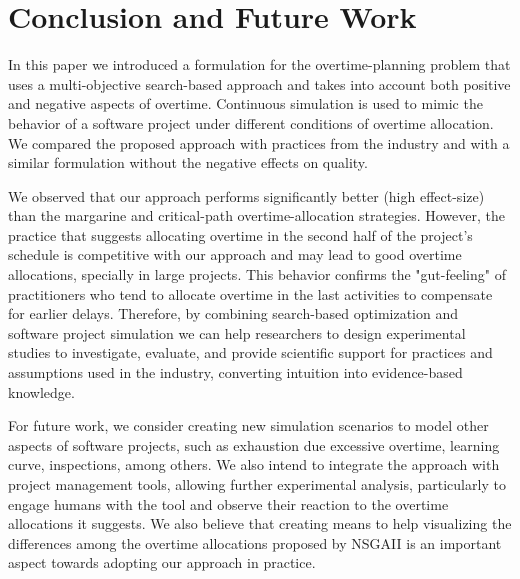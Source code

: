 \documentclass[conference]{IEEEtran}
\begin{document}
\section{Conclusion and Future Work}

In this paper we introduced a formulation for the overtime-planning problem that uses a multi-objective search-based approach and takes into account both positive and negative aspects of overtime. Continuous simulation is used to mimic the behavior of a software project under different conditions of overtime allocation. We compared the proposed approach with practices from the industry and with a similar formulation without the negative effects on quality. 

We observed that our approach performs significantly better (high effect-size) than the margarine and critical-path overtime-allocation strategies. However, the practice that suggests allocating overtime in the second half of the project's schedule is competitive with our approach and may lead to good overtime allocations, specially in large projects. This behavior confirms the "gut-feeling" of practitioners who tend to allocate overtime in the last activities to compensate for earlier delays. Therefore, by combining search-based optimization and software project simulation we can help researchers to design experimental studies to investigate, evaluate, and provide scientific support for practices and assumptions used in the industry, converting intuition into evidence-based knowledge. 

For future work, we consider creating new simulation scenarios to model other aspects of software projects, such as exhaustion due excessive overtime, learning curve, inspections, among others. We also intend to integrate the approach with project management tools, allowing further experimental analysis, particularly to engage humans with the tool and observe their reaction to the overtime allocations it suggests. We also believe that creating means to help visualizing the differences among the overtime allocations proposed by NSGAII is an important aspect towards adopting our approach in practice.




\end{document}
